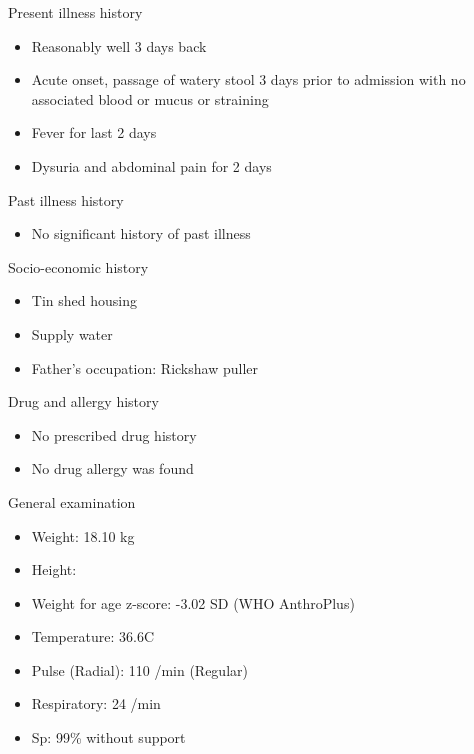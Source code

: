 \documentclass[10pt]{beamer}
\begin{document}
{
\begin{frame}{Present illness history}
	\begin{itemize}
		\item Reasonably well 3 days back
		\item Acute onset, passage of watery stool 3 days prior to admission with no associated blood or mucus or straining
		\item Fever for last 2 days
		\item Dysuria and abdominal pain for 2 days
	\end{itemize}
\end{frame}
}

{
	\begin{frame}{Past illness history}
		\begin{itemize}
			\item No significant history of past illness
		\end{itemize}
	\end{frame}
}

{
\begin{frame}{Socio-economic history}
	\begin{itemize}
		\item Tin shed housing 
		\item Supply water
		\item Father’s occupation: Rickshaw puller
	\end{itemize}
\end{frame}
}

{
	\begin{frame}{Drug and allergy history}
		\begin{itemize}
			\item No prescribed drug history
			\item No drug allergy was found
		\end{itemize}
	\end{frame}
}


{
\begin{frame}{General examination}
	\begin{itemize}
		\item Weight: 18.10 kg
		\item Height: 
		\item Weight for age z-score: -3.02 SD (WHO AnthroPlus)
		\item Temperature: 36.6\textdegree{}C
		\item Pulse (Radial): 110 /min (Regular)
		\item Respiratory: 24 /min
		\item Sp: 99\% without  support
	\end{itemize}
\end{frame}
}
\end{document}
